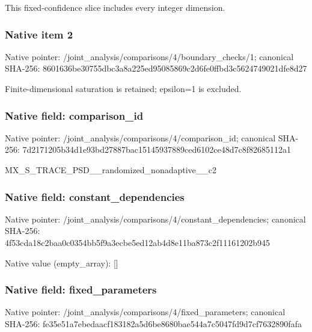 \documentclass[10pt,a4paper]{article}
\begin{document}
\begingroup\raggedright\sloppy This fixed-confidence slice includes every integer dimension.\par\endgroup

\subsubsection{Native item 2}
Native pointer: /joint\_\allowbreak{}analysis/comparisons/4/boundary\_\allowbreak{}checks/1; canonical SHA-256: 8601636be30755dbc3a8a225ed95085869c2d6fe0ffbd3c5624749021dfe8d27

\begingroup\raggedright\sloppy Finite-dimensional saturation is retained;\allowbreak{} epsilon=\allowbreak{}1 is excluded.\par\endgroup

\subsubsection{Native field: comparison\_\allowbreak{}id}
Native pointer: /joint\_\allowbreak{}analysis/comparisons/4/comparison\_\allowbreak{}id; canonical SHA-256: 7d2171205b34d1e93bd27887bac15145937889ced6102ce48d7c8f82685112a1

\begingroup\raggedright\sloppy MX\_\allowbreak{}S\_\allowbreak{}TRACE\_\allowbreak{}PSD\_\allowbreak{}\_\allowbreak{}randomized\_\allowbreak{}nonadaptive\_\allowbreak{}\_\allowbreak{}c2\par\endgroup

\subsubsection{Native field: constant\_\allowbreak{}dependencies}
Native pointer: /joint\_\allowbreak{}analysis/comparisons/4/constant\_\allowbreak{}dependencies; canonical SHA-256: 4f53cda18c2baa0c0354bb5f9a3ecbe5ed12ab4d8e11ba873c2f11161202b945

Native value (empty\_\allowbreak{}array): []

\subsubsection{Native field: fixed\_\allowbreak{}parameters}
Native pointer: /joint\_\allowbreak{}analysis/comparisons/4/fixed\_\allowbreak{}parameters; canonical SHA-256: fe35e51a7ebedaacf183182a5d6be8680bae544a7c5047fd9d7cf7632890fafa
\end{document}
